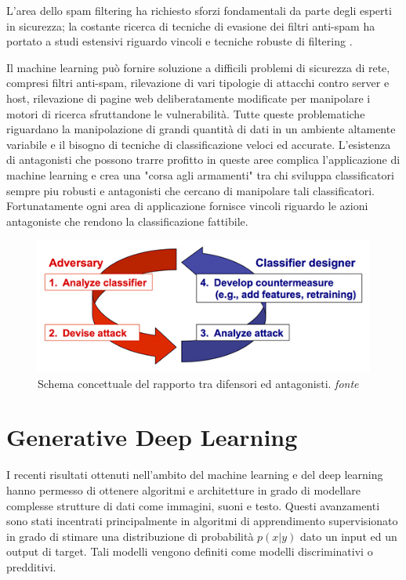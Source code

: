 L'area dello spam filtering ha richiesto sforzi fondamentali da parte degli esperti in sicurezza; la costante ricerca di tecniche di evasione dei filtri anti-spam ha portato a studi estensivi riguardo vincoli e tecniche robuste di filtering \cite{dalvi}. 

Il machine learning può fornire soluzione a difficili problemi di sicurezza di rete, compresi filtri anti-spam, rilevazione di vari tipologie di attacchi contro server e host, rilevazione di pagine web 
deliberatamente modificate per manipolare i motori di ricerca sfruttandone le vulnerabilità. Tutte queste problematiche riguardano la manipolazione di grandi quantità di dati in un ambiente altamente variabile e il bisogno di tecniche di classificazione veloci ed accurate. L'esistenza di antagonisti che possono trarre profitto in queste aree complica l'applicazione di machine learning e crea una "corsa agli armamenti" tra chi sviluppa classificatori sempre piu robusti e antagonisti che cercano di manipolare tali classificatori. Fortunatamente ogni area di applicazione fornisce vincoli riguardo le azioni antagoniste che rendono la classificazione fattibile. 

\begin{figure}[!htbp]
	\centering
	\includegraphics[width=\columnwidth]{figures/Reactive_arms_race.jpg}
	\caption{Schema concettuale del rapporto tra difensori ed antagonisti. \textit{fonte}%
	 \cite{wiki:Adversarial_machine_learning} \label{fig:advarms} }
\end{figure}

\newpage
\section{Generative Deep Learning}
I recenti risultati ottenuti nell'ambito del machine learning e del deep learning hanno permesso di ottenere algoritmi e architetture in grado di modellare complesse strutture di dati come immagini, suoni e testo. Questi avanzamenti sono stati incentrati principalmente in algoritmi di apprendimento supervisionato in grado di stimare una distribuzione di probabilità $p(x|y)$ dato un input ed un output di target. Tali modelli vengono definiti come modelli discriminativi o predditivi.

